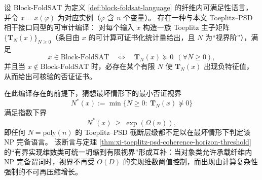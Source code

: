 \begin{conjecture}\label{conj:xi-toeplitz-psd-horizon-block-foldsat}
设 \(\mathrm{Block}\text{-}\mathrm{FoldSAT}\) 为定义 \ref{def:block-foldsat-language} 的纤维内可满足性语言，并令 \(x=x(\varphi)\) 为对应实例（\(\varphi\) 含 \(n\) 个变量）。
存在一种与本文 Toeplitz--PSD 相干接口同型的可审计编译：
对每个输入 \(x\) 构造一族 Toeplitz 主子矩阵 \(\{\mathbf{T}_N(x)\}_{N\ge 0}\)（条目由 \(x\) 的可计算可证书化统计量给出，且 \(N\) 为“视界阶”），满足
\[
x\in\mathrm{Block}\text{-}\mathrm{FoldSAT}
\quad\Longleftrightarrow\quad
\mathbf{T}_N(x)\succeq 0\ \ (\forall N\ge 0),
\]
并且当 \(x\notin\mathrm{Block}\text{-}\mathrm{FoldSAT}\) 时，必存在某个有限 \(N\) 使 \(\mathbf{T}_N(x)\) 出现负特征值，从而给出可核验的否证证书。
\par
在此编译存在的前提下，猜想最坏情形下的最小否证视界
\[
N^\ast(x):=\min\{N\ge 0:\ \mathbf{T}_N(x)\not\succeq 0\}
\]
满足指数下界
\[
N^\ast(x)\ \ge\ \exp(\Omega(n)),
\]
即任何 \(N=\mathrm{poly}(n)\) 的 Toeplitz--PSD 截断层级都不足以在最坏情形下判定该 NP 完备语言。
该断言与定理 \ref{thm:xi-toeplitz-psd-coherence-horizon-threshold} 的“有界实现维数类可统一坍缩到有限视界”形成互补：当对象类允许承载纤维内 NP 完备谓词时，视界不再受 \(O(D)\) 的实现维数阈值控制，而出现由计算复杂性强制的不可再压缩增长。
\end{conjecture}

\endinput


